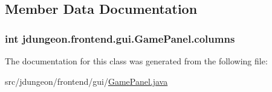 \subsection{Member Data Documentation}
\hypertarget{classjdungeon_1_1frontend_1_1gui_1_1_game_panel_aba784807153277ead51c3af9df110bbd}{
\subsubsection[{columns}]{\setlength{\rightskip}{0pt plus 5cm}int {\bf jdungeon.frontend.gui.GamePanel.columns}}}
\label{classjdungeon_1_1frontend_1_1gui_1_1_game_panel_aba784807153277ead51c3af9df110bbd}


The documentation for this class was generated from the following file:\begin{DoxyCompactItemize}
\item 
src/jdungeon/frontend/gui/\hyperlink{_game_panel_8java}{GamePanel.java}\end{DoxyCompactItemize}
